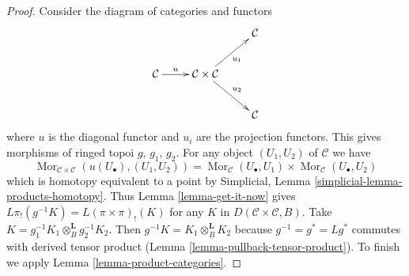 \documentclass[10pt,a4paper]{amsart}
\theoremstyle{plain}
\theoremstyle{definition}
\theoremstyle{remark}
\numberwithin{equation}{subsection}
\def\Mor{\mathop{\mathrm{Mor}}\nolimits}
\begin{document}
\begin{proof}
Consider the diagram of categories and functors
$$
\xymatrix{
& & \mathcal{C} \\
\mathcal{C} \ar[r]^-u &
\mathcal{C} \times \mathcal{C} \ar[rd]^{u_2} \ar[ru]_{u_1} \\
& & \mathcal{C}
}
$$
where $u$ is the diagonal functor and $u_i$ are the projection functors.
This gives morphisms of ringed topoi $g$, $g_1$, $g_2$.
For any object $(U_1, U_2)$ of $\mathcal{C}$ we have
$$
\Mor_{\mathcal{C} \times \mathcal{C}}(u(U_\bullet), (U_1, U_2)) =
\Mor_\mathcal{C}(U_\bullet, U_1) \times \Mor_\mathcal{C}(U_\bullet, U_2)
$$
which is homotopy equivalent to a point by
Simplicial, Lemma \ref{simplicial-lemma-products-homotopy}.
Thus Lemma \ref{lemma-get-it-now} gives
$L\pi_!(g^{-1}K) = L(\pi \times \pi)_!(K)$ for any $K$ in
$D(\mathcal{C} \times \mathcal{C}, B)$.
Take $K = g_1^{-1}K_1 \otimes_B^\mathbf{L} g_2^{-1}K_2$.
Then $g^{-1}K = K_1 \otimes^\mathbf{L}_{\underline{B}} K_2$
because $g^{-1} = g^* = Lg^*$ commutes with derived tensor product
(Lemma \ref{lemma-pullback-tensor-product}).
To finish we apply Lemma \ref{lemma-product-categories}.
\end{proof}
\end{document}
